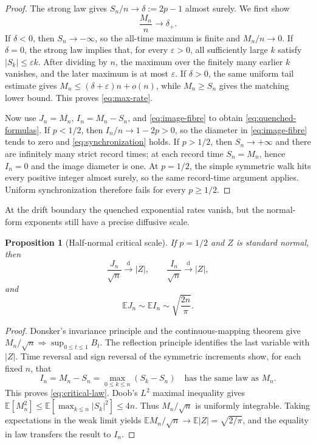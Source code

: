 \documentclass[11pt,a4paper]{amsart}
\newtheorem{proposition}[theorem]{Proposition}
\theoremstyle{definition}
\theoremstyle{remark}
\newcommand{\Exp}{\mathbb E}
\begin{document}
\begin{proof}
The strong law gives $S_n/n\to\delta:=2p-1$ almost surely.  We first show
\begin{equation}\label{eq:max-rate}
 \frac{M_n}{n}\longrightarrow\delta_+.
\end{equation}
If $\delta<0$, then $S_n\to-\infty$, so the all-time maximum is finite and
$M_n/n\to0$.  If $\delta=0$, the strong law implies that, for every
$\varepsilon>0$, all sufficiently large $k$ satisfy
$|S_k|\leq\varepsilon k$.  After dividing by $n$, the maximum over the
finitely many earlier $k$ vanishes, and the later maximum is at most
$\varepsilon$.  If $\delta>0$, the same uniform tail estimate gives
$M_n\leq(\delta+\varepsilon)n+o(n)$, while $M_n\geq S_n$ gives the matching
lower bound.  This proves \eqref{eq:max-rate}.

Now use $J_n=M_n$, $I_n=M_n-S_n$, and \eqref{eq:image-fibre} to obtain
\eqref{eq:quenched-formulas}.  If $p<1/2$, then $I_n/n\to1-2p>0$, so the
diameter in \eqref{eq:image-fibre} tends to zero and
\eqref{eq:synchronization} holds.  If $p>1/2$, then $S_n\to+\infty$ and
there are infinitely many strict record times; at each record time
$S_n=M_n$, hence $I_n=0$ and the image diameter is one.  At $p=1/2$, the
simple symmetric walk hits every positive integer almost surely, so the
same record-time argument applies.  Uniform synchronization therefore fails
for every $p\geq1/2$.
\end{proof}

At the drift boundary the quenched exponential rates vanish, but the
normal-form exponents still have a precise diffusive scale.

\begin{proposition}[Half-normal critical scale]\label{prop:critical-scale}
If $p=1/2$ and $Z$ is standard normal, then
\begin{equation}\label{eq:critical-law}
 \frac{J_n}{\sqrt n}\xrightarrow{\mathrm d}|Z|,
 \qquad
 \frac{I_n}{\sqrt n}\xrightarrow{\mathrm d}|Z|,
\end{equation}
and
\begin{equation}\label{eq:critical-means}
 \Exp J_n\sim\Exp I_n\sim\sqrt{\frac{2n}{\pi}}.
\end{equation}
\end{proposition}

\begin{proof}
Donsker's invariance principle and the continuous-mapping theorem
\cite{Billingsley1999} give
$M_n/\sqrt n\Rightarrow\sup_{0\leq t\leq1}B_t$.  The reflection principle
identifies the last variable with $|Z|$.  Time reversal and sign reversal of
the symmetric increments show, for each fixed $n$, that
\[
 I_n=M_n-S_n
 =\max_{0\leq k\leq n}(S_k-S_n)
 \quad\text{has the same law as }M_n.
\]
This proves \eqref{eq:critical-law}.  Doob's $L^2$ maximal inequality gives
$\Exp[M_n^2]\leq\Exp[\max_{k\leq n}|S_k|^2]\leq4n$.  Thus
$M_n/\sqrt n$ is uniformly integrable.  Taking expectations in the weak
limit yields $\Exp M_n/\sqrt n\to\Exp|Z|=\sqrt{2/\pi}$, and the equality in
law transfers the result to $I_n$.
\end{proof}
\end{document}

